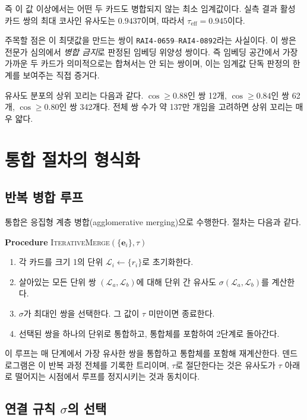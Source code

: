 \documentclass[11pt,a4paper]{article}
\newcommand{\cL}{\mathcal{L}}
\begin{document}
즉 이 값 이상에서는 어떤 두 카드도 병합되지 않는 최소 임계값이다. 실측 결과 활성 카드 쌍의 최대 코사인 유사도는 $0.9437$이며, 따라서 $\tau_{\mathrm{eff}} = 0.945$이다.

주목할 점은 이 최댓값을 만드는 쌍이 \texttt{RAI4-0659}--\texttt{RAI4-0892}라는 사실이다. 이 쌍은 전문가 심의에서 \emph{병합 금지}로 판정된 임베딩 위양성 쌍이다. 즉 임베딩 공간에서 가장 가까운 두 카드가 의미적으로는 합쳐서는 안 되는 쌍이며, 이는 임계값 단독 판정의 한계를 보여주는 직접 증거다.

유사도 분포의 상위 꼬리는 다음과 같다. $\cos \geq 0.88$인 쌍 12개, $\cos \geq 0.84$인 쌍 62개, $\cos \geq 0.80$인 쌍 342개다. 전체 쌍 수가 약 137만 개임을 고려하면 상위 꼬리는 매우 얇다.

\section{통합 절차의 형식화}

\subsection{반복 병합 루프}

통합은 응집형 계층 병합(agglomerative merging)으로 수행한다. 절차는 다음과 같다.

\begin{mdframed}[linewidth=0.5pt,innertopmargin=6pt,innerbottommargin=6pt]
\textbf{Procedure} \textsc{IterativeMerge}$(\{\mathbf{e}_i\}, \tau)$
\begin{enumerate}[leftmargin=2.0em,itemsep=1pt]
  \item 각 카드를 크기 1의 단위 $\cL_i \leftarrow \{r_i\}$로 초기화한다.
  \item 살아있는 모든 단위 쌍 $(\cL_a, \cL_b)$에 대해 단위 간 유사도 $\sigma(\cL_a, \cL_b)$를 계산한다.
  \item $\sigma$가 최대인 쌍을 선택한다. 그 값이 $\tau$ 미만이면 종료한다.
  \item 선택된 쌍을 하나의 단위로 통합하고, 통합체를 포함하여 2단계로 돌아간다.
\end{enumerate}
\end{mdframed}

이 루프는 매 단계에서 가장 유사한 쌍을 통합하고 통합체를 포함해 재계산한다. 덴드로그램은 이 반복 과정 전체를 기록한 트리이며, $\tau$로 절단한다는 것은 유사도가 $\tau$ 아래로 떨어지는 시점에서 루프를 정지시키는 것과 동치이다.

\subsection{연결 규칙 $\sigma$의 선택}
\end{document}
